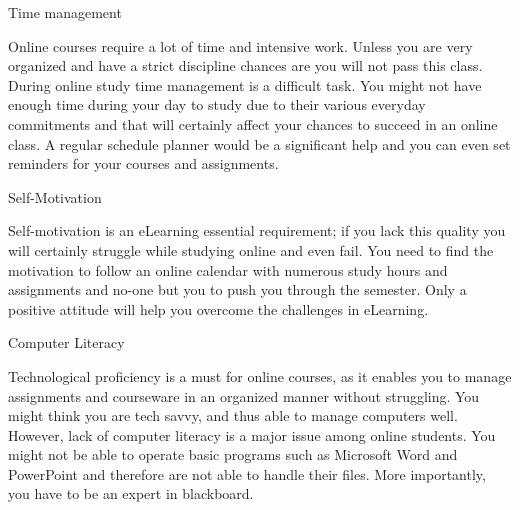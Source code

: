 \documentclass[main.tex]{subfiles}
\begin{document}
\begin{fullwidth}
\begin{multicols*}{2}
\noindent\begin{bf} Time management\end{bf}\par
Online courses require a lot of time and intensive work. Unless you are very organized and have a strict discipline chances are you will not pass this class. During online study time management is a difficult task. You might not have enough time during your day to study due to their various everyday commitments and that will certainly affect your chances to succeed in an online class. A regular schedule planner would be a significant help and you can even set reminders for your courses and assignments.

\noindent\begin{bf} Self-Motivation\end{bf}\par
Self-motivation is an eLearning essential requirement; if you lack this quality you will certainly struggle while studying online and even fail.
You need to find the motivation to follow an online calendar with numerous study hours and assignments and no-one but you to push you through the semester. Only a positive attitude will help you overcome the challenges in eLearning.

\noindent\begin{bf} Computer Literacy\end{bf}\par
Technological proficiency is a must for online courses, as it enables you to manage assignments and courseware in an organized manner without struggling. You might think you are tech savvy, and thus able to manage computers well. However, lack of computer literacy is a major issue among online students. You might not be able to operate basic programs such as Microsoft Word and PowerPoint and therefore are not able to handle their files. More importantly, you have to be an expert in blackboard. 

\end{multicols*}
\end{fullwidth}
\restoregeometry
\end{document}
